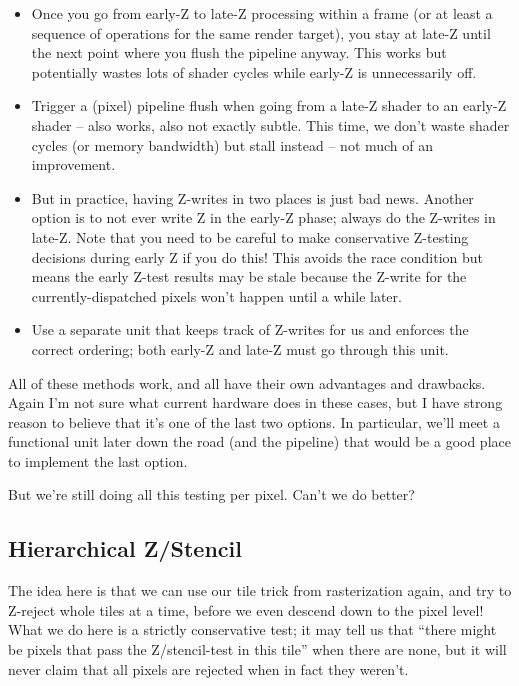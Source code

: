 \documentclass[12pt]{article}
\begin{document}
\begin{itemize}
\item Once you go from early-Z to late-Z processing within a frame (or at least a sequence of operations for the same render target), you stay at late-Z until the next point where you flush the pipeline anyway. This works but potentially wastes lots of shader cycles while early-Z is unnecessarily off.
\item Trigger a (pixel) pipeline flush when going from a late-Z shader to an early-Z shader – also works, also not exactly subtle. This time, we don’t waste shader cycles (or memory bandwidth) but stall instead – not much of an improvement.
\item But in practice, having Z-writes in two places is just bad news. Another option is to not ever write Z in the early-Z phase; always do the Z-writes in late-Z. Note that you need to be careful to make conservative Z-testing decisions during early Z if you do this! This avoids the race condition but means the early Z-test results may be stale because the Z-write for the currently-dispatched pixels won’t happen until a while later.
\item Use a separate unit that keeps track of Z-writes for us and enforces the correct ordering; both early-Z and late-Z must go through this unit.
\end{itemize}

All of these methods work, and all have their own advantages and drawbacks. Again I’m not sure what current hardware does in these cases, but I have strong reason to believe that it’s one of the last two options. In particular, we’ll meet a functional unit later down the road (and the pipeline) that would be a good place to implement the last option.

But we’re still doing all this testing per pixel. Can’t we do better?

\subsection{Hierarchical Z/Stencil}
\label{sec:org7a916b0}

The idea here is that we can use our tile trick from rasterization again, and try to Z-reject whole tiles at a time, before we even descend down to the pixel level! What we do here is a strictly conservative test; it may tell us that “there might be pixels that pass the Z/stencil-test in this tile” when there are none, but it will never claim that all pixels are rejected when in fact they weren’t.
\end{document}
